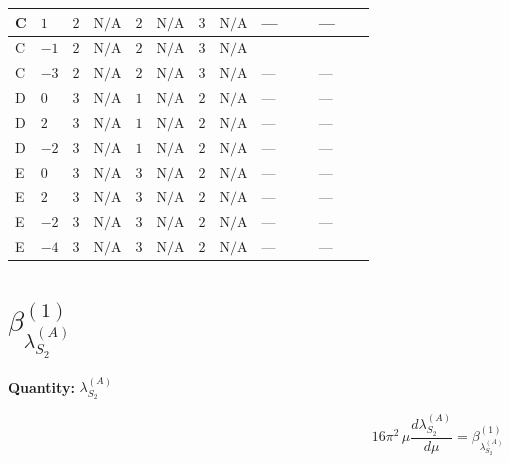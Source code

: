 \documentclass[8pt]{article}
\begin{document}
\begin{landscape}
\begin{longtable}{@{}llcccccc >{\raggedright\arraybackslash}p{0.21\linewidth} >{\raggedright\arraybackslash}p{0.21\linewidth}@{}}
\midrule
C & $1$ & $2$ & $\text{N/A}$ & $2$ & $\text{N/A}$ & $3$ & $\text{N/A}$ & --- & --- \\
\midrule
C & $-1$ & $2$ & $\text{N/A}$ & $2$ & $\text{N/A}$ & $3$ & $\text{N/A}$ & \scriptsize\adjustbox{max width=\linewidth}{$\begin{gathered} +{\lambda_{HS_2}^{(A)}} \left(-\frac{{\lambda_{H H^\dagger S_1^\dagger S_2^\dagger}^{\rm Cross}}}{2}-\frac{{\lambda_{X_{17}}^{(1)}}}{2}\right)\end{gathered}$} & \scriptsize\adjustbox{max width=\linewidth}{$\begin{gathered} +12 {\lambda_{10}} {\lambda_{S_2}^{(1)}}\end{gathered}$} \\
\midrule
C & $-3$ & $2$ & $\text{N/A}$ & $2$ & $\text{N/A}$ & $3$ & $\text{N/A}$ & --- & --- \\
\midrule
D & $0$ & $3$ & $\text{N/A}$ & $1$ & $\text{N/A}$ & $2$ & $\text{N/A}$ & --- & --- \\
\midrule
D & $2$ & $3$ & $\text{N/A}$ & $1$ & $\text{N/A}$ & $2$ & $\text{N/A}$ & --- & --- \\
\midrule
D & $-2$ & $3$ & $\text{N/A}$ & $1$ & $\text{N/A}$ & $2$ & $\text{N/A}$ & --- & --- \\
\midrule
E & $0$ & $3$ & $\text{N/A}$ & $3$ & $\text{N/A}$ & $2$ & $\text{N/A}$ & --- & --- \\
\midrule
E & $2$ & $3$ & $\text{N/A}$ & $3$ & $\text{N/A}$ & $2$ & $\text{N/A}$ & --- & --- \\
\midrule
E & $-2$ & $3$ & $\text{N/A}$ & $3$ & $\text{N/A}$ & $2$ & $\text{N/A}$ & --- & --- \\
\midrule
E & $-4$ & $3$ & $\text{N/A}$ & $3$ & $\text{N/A}$ & $2$ & $\text{N/A}$ & --- & --- \\
\midrule
\bottomrule
\end{longtable}
\clearpage
\section*{$\beta_{\lambda_{S_2}^{(A)}}^{(1)}$}
\noindent\textbf{Quantity: }$\lambda_{S_2}^{(A)}$\par\smallskip
\[16\pi^2\,\mu\frac{d \lambda_{S_2}^{(A)}}{d\mu}=\beta_{\lambda_{S_2}^{(A)}}^{(1)}\]

\end{landscape}
\end{document}
